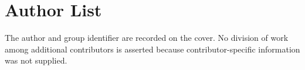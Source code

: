 \section{Author List}

The author and group identifier are recorded on the cover. No division of work among additional contributors is asserted because contributor-specific information was not supplied.
